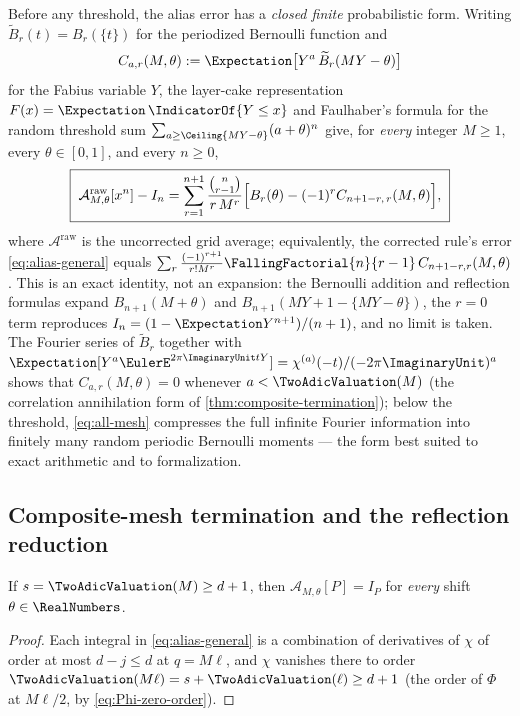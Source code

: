 Before any threshold, the alias error has a \emph{closed finite}
probabilistic form.  Writing $\widetilde B_r(t)=B_r(\{t\})$ for the
periodized Bernoulli function and
\begin{equation}
 C_{a,r}(M,\theta):=\Expectation\bigl[Y^{a}\,\widetilde B_r(MY-\theta)\bigr]
 \label{eq:alias-correlation}
\end{equation}
for the Fabius variable $Y$, the layer-cake representation
$F(x)=\Expectation\,\IndicatorOf{Y\le x}$ and Faulhaber's formula for the random
threshold sum $\sum_{a\ge\Ceiling{MY-\theta}}(a+\theta)^{n}$ give,
for \emph{every} integer $M\ge1$, every $\theta\in[0,1]$, and every
$n\ge0$,
\begin{equation}
 \boxed{\;
 \mathcal A^{\mathrm{raw}}_{M,\theta}[x^{n}]-I_n
 =\sum_{r=1}^{n+1}\frac{\binom n{r-1}}{r\,M^{r}}
 \Bigl[B_r(\theta)-(-1)^{r}C_{n+1-r,\,r}(M,\theta)\Bigr],\;}
 \label{eq:all-mesh}
\end{equation}
where $\mathcal A^{\mathrm{raw}}$ is the uncorrected grid average;
equivalently, the corrected rule's error \eqref{eq:alias-general} equals
$\sum_{r}\frac{(-1)^{r+1}}{r!M^{r}}\FallingFactorial{n}{r-1}\,C_{n+1-r,r}(M,\theta)$.
This is an exact identity, not an expansion: the Bernoulli addition and
reflection formulas expand $B_{n+1}(M+\theta)$ and
$B_{n+1}(MY+1-\{MY-\theta\})$, the $r=0$ term reproduces
$I_n=(1-\Expectation Y^{n+1})/(n+1)$, and no limit is taken.  The Fourier series
of $\widetilde B_r$ together with
$\Expectation[Y^{a}\EulerE^{2\pi\ImaginaryUnit tY}]=\chi^{(a)}(-t)/(-2\pi\ImaginaryUnit)^{a}$ shows that
$C_{a,r}(M,\theta)=0$ whenever $a<\TwoAdicValuation(M)$ (the correlation
annihilation form of \cref{thm:composite-termination}); below the
threshold, \eqref{eq:all-mesh} compresses the full infinite Fourier
information into finitely many random periodic Bernoulli moments ---
the form best suited to exact arithmetic and to formalization.

\subsection{Composite-mesh termination and the reflection reduction}

\begin{theorem}
\label{thm:composite-termination}
If $s=\TwoAdicValuation(M)\ge d+1$, then
$\mathcal A_{M,\theta}[P]=I_P$ for \emph{every} shift $\theta\in\RealNumbers$.
\end{theorem}

\begin{proof}
Each integral in \eqref{eq:alias-general} is a combination of
derivatives of $\chi$ of order at most $d-j\le d$ at $q=M\ell$, and
$\chi$ vanishes there to order $\TwoAdicValuation(M\ell)=s+\TwoAdicValuation(\ell)\ge d+1$ (the
order of $\Phi$ at $M\ell/2$, by \eqref{eq:Phi-zero-order}).
\end{proof}

